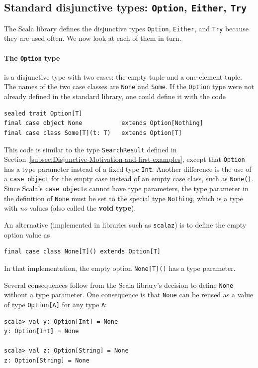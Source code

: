 \subsection{Standard disjunctive types: \texttt{Option}, \texttt{Either}, \texttt{Try}}

The Scala library defines the disjunctive types \lstinline!Option!,
\lstinline!Either!, and \lstinline!Try! because they are used often.
We now look at each of them in turn.

\paragraph{The \texttt{Option} type}

is a disjunctive type with two cases: the empty tuple and a one-element
tuple. The names of the two case classes are \lstinline!None! and
\lstinline!Some!. If the \lstinline!Option! type were not already
defined in the standard library, one could define it with the code
\begin{lstlisting}
sealed trait Option[T]
final case object None           extends Option[Nothing]
final case class Some[T](t: T)   extends Option[T]
\end{lstlisting}
This code is similar to the type \lstinline!SearchResult! defined
in Section~\ref{subsec:Disjunctive-Motivation-and-first-examples},
except that \lstinline!Option! has a type parameter instead of a
fixed type \lstinline!Int!. Another difference is the use of a \lstinline!case object!
for the empty case instead of an empty case class, such as \lstinline!None()!.
Since Scala's \lstinline!case object!s cannot have type parameters,
the type parameter in the definition of \lstinline!None! must be
set to the special type \lstinline!Nothing!, which is a type with
\emph{no} values (also called the \textbf{void} \textbf{type}).

An alternative (implemented in libraries such as \texttt{scalaz})
is to define the empty option value as
\begin{lstlisting}
final case class None[T]() extends Option[T]
\end{lstlisting}
In that implementation, the empty option \lstinline!None[T]()! has
a type parameter.

Several consequences follow from the Scala library's decision to define
\lstinline!None! without a type parameter. One consequence is that
\lstinline!None! can be reused as a value of type \lstinline!Option[A]!
for any type \lstinline!A!:
\begin{lstlisting}
scala> val y: Option[Int] = None
y: Option[Int] = None

scala> val z: Option[String] = None
z: Option[String] = None
\end{lstlisting}

